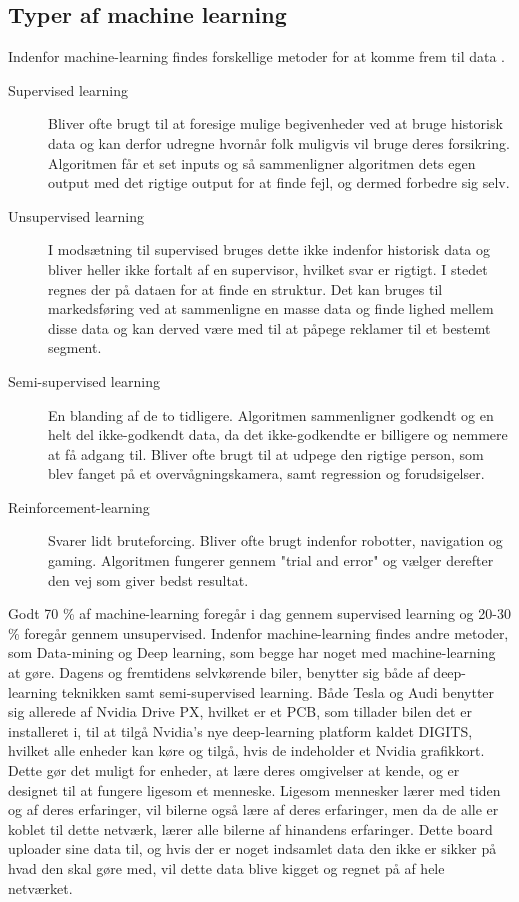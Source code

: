 \subsection{Typer af machine learning}
Indenfor machine-learning findes forskellige metoder for at komme frem til data \cite{MachineLearning}. 
	\begin{description}
		\item[Supervised learning] Bliver ofte brugt til at foresige mulige begivenheder ved at bruge historisk data og kan derfor udregne hvornår folk muligvis vil bruge deres forsikring. Algoritmen får et set inputs og så sammenligner algoritmen dets egen output med det rigtige output for at finde fejl, og dermed forbedre sig selv.
		\item[Unsupervised learning] I modsætning til supervised bruges dette ikke indenfor historisk data og bliver heller ikke fortalt af en supervisor, hvilket svar er rigtigt. I stedet regnes der på dataen for at finde en struktur. Det kan bruges til markedsføring ved at sammenligne en masse data og finde lighed mellem disse data og kan derved være med til at påpege reklamer til et bestemt segment.
		\item[Semi-supervised learning] En blanding af de to tidligere. Algoritmen sammenligner godkendt og en helt del ikke-godkendt data, da det ikke-godkendte er billigere og nemmere at få adgang til. Bliver ofte brugt til at udpege den rigtige person, som blev fanget på et overvågningskamera, samt regression og forudsigelser.
		\item[Reinforcement-learning] Svarer lidt bruteforcing. Bliver ofte brugt indenfor robotter, navigation og gaming. Algoritmen fungerer gennem "trial and error" og vælger derefter den vej som giver bedst resultat.
	\end{description}
Godt 70 \% af machine-learning foregår i dag gennem supervised learning og 20-30 \% foregår gennem unsupervised. Indenfor machine-learning findes andre metoder, som Data-mining og Deep learning, som begge har noget med machine-learning at gøre. Dagens og fremtidens selvkørende biler, benytter sig både af deep-learning teknikken samt semi-supervised learning\cite{Musk}. Både Tesla og Audi benytter sig allerede af Nvidia Drive PX, hvilket er et PCB, som tillader bilen det er installeret i, til at tilgå Nvidia's nye deep-learning platform kaldet DIGITS, hvilket alle enheder kan køre og tilgå, hvis de indeholder et Nvidia grafikkort. Dette gør det muligt for enheder, at lære deres omgivelser at kende, og er designet til at fungere ligesom et menneske. Ligesom mennesker lærer med tiden og af deres erfaringer, vil bilerne også lære af deres erfaringer, men da de alle er koblet til dette netværk, lærer alle bilerne af hinandens erfaringer\cite{Nvidia}. Dette board uploader sine data til, og hvis der er noget indsamlet data den ikke er sikker på hvad den skal gøre med, vil dette data blive kigget og regnet på af hele netværket.